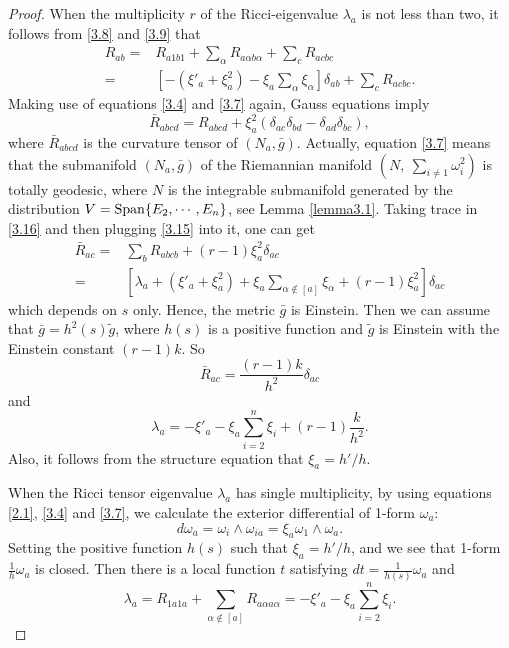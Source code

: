 \documentclass{amsart}
\theoremstyle{definition}
\theoremstyle{remark}
\numberwithin{equation}{section}
\begin{document}
\begin{proof}
	When the multiplicity $r$ of the Ricci-eigenvalue $\lambda_{a}$ is not less than two, it follows from  \eqref{3.8} and \eqref{3.9} that 
	\begin{equation}
	\begin{aligned}\label{3.15}
	R_{ab}=&R_{a1 b1}+\sum_{\alpha}R_{a\alpha b\alpha}+\sum_{c} R_{acbc}\\
	=&\left[ -\left( \xi'_a+\xi^2_a \right) -\xi_a \sum_{\alpha} \xi_\alpha \right] \delta_{ab} 
	+\sum_{c} R_{acbc}.
	\end{aligned}
	\end{equation}
	Making use of equations \eqref{3.4} and \eqref{3.7} again, Gauss equations imply
	\begin{equation}\label{3.16}
	\bar{R}_{abcd}={R}_{abcd}+
	\xi^2_{a}\left( \delta_{ac}\delta_{bd}-\delta_{ad}\delta_{bc} \right),
	\end{equation}
	where $\bar{R}_{abcd}$ is the curvature tensor of $\left( N_a, \bar{g}\right) $.
	Actually, equation \eqref{3.7} means that the submanifold $(N_a,\bar{g})$ of the Riemannian manifold 
	$(N,~\sum_{i\neq1} \omega^2_{i})$ is totally geodesic, where $N$ is the integrable submanifold generated by the distribution
	$V={\rm Span} \{E_2, \cdots, E_n \} $, see Lemma \ref{lemma3.1}.
	Taking trace in \eqref{3.16} and then plugging \eqref{3.15} into it, one can get
	\begin{equation*}
	\begin{aligned}
	\bar{R}_{ac}=&\sum_{b}R_{abcb}+\left( r-1\right) \xi^2_{a}\delta_{ac}\\
	=& \left[\lambda_a+\left( \xi'_a+\xi^2_a \right) +\xi_a \sum_{\alpha \notin [a]} \xi_\alpha +( r-1) \xi^2_{a} \right] \delta_{ac}
	\end{aligned}
	\end{equation*}
	which depends on $s$ only. Hence, the metric $\bar{g}$ is Einstein.
	Then we can assume that $\bar{g}=h^2(s)\tilde{g}$, where $h(s)$ is a positive function and $\tilde{g}$ is Einstein with the Einstein constant $(r-1)k$. So 
	\[
	\bar{R}_{ac}=\frac{(r-1)k}{h^2}\delta_{ac}
	\]
	and 
		\begin{equation}\label{3.17}
		\lambda_a=- \xi'_a-\xi_a \sum^{n}_{i=2} \xi_i +( r-1)\frac{k}{h^2}.
	\end{equation}
	Also, it follows from the structure equation that $\xi_a=h'/h$.

	When the Ricci tensor eigenvalue $\lambda_a$ has single multiplicity,
	by using equations \eqref{2.1}, \eqref{3.4} and \eqref{3.7}, 
	we calculate the exterior differential of 1-form $\omega_a$: 
	\[
	d\omega_a=\omega_{i}\wedge\omega_{ia}=\xi_a\omega_{1}\wedge\omega_a.
	\]
	Setting the positive function $h(s)$ such that $\xi_a=h'/h$, and we see that
   1-form $\frac{1}{h}\omega_a$ is closed. Then there is a local function $t$ satisfying
	$dt =\frac{1}{h(s)} \omega_a$ and 
	\begin{equation}\label{3.18}
	\lambda_a=R_{1a1 a}+\sum_{\alpha \notin [a]}R_{a\alpha a\alpha}
	=- \xi'_a-\xi_a \sum^{n}_{i=2} \xi_i.
	\end{equation}
	

\end{proof}
\end{document}
